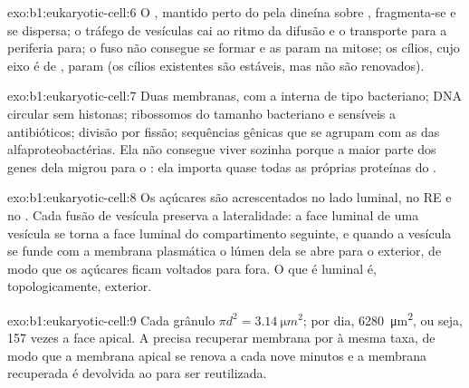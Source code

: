 \begin{solution}{exo:b1:eukaryotic-cell:6}
O , mantido perto do  pela dineína sobre ,
fragmenta-se e se dispersa; o tráfego de vesículas cai ao ritmo da
difusão e o transporte para a periferia para; o fuso não consegue se
formar e as  param na mitose; os cílios, cujo eixo é de
, param (os cílios existentes são estáveis, mas não são
renovados).
\end{solution}

\begin{solution}{exo:b1:eukaryotic-cell:7}
Duas membranas, com a interna de tipo bacteriano; DNA circular sem
histonas; ribossomos do tamanho bacteriano e sensíveis a antibióticos;
divisão por fissão; sequências gênicas que se agrupam com as das
alfaproteobactérias. Ela não consegue viver sozinha porque a maior parte
dos genes dela migrou para o : ela importa quase todas as próprias
proteínas do .
\end{solution}

\begin{solution}{exo:b1:eukaryotic-cell:8}
Os açúcares são acrescentados no lado luminal, no RE e no . Cada
fusão de vesícula preserva a lateralidade: a face luminal de uma
vesícula se torna a face luminal do compartimento seguinte, e quando a
vesícula se funde com a membrana plasmática o lúmen dela se abre para o
exterior, de modo que os açúcares ficam voltados para fora. O que é
luminal é, topologicamente, exterior.
\end{solution}

\begin{solution}{exo:b1:eukaryotic-cell:9}
Cada grânulo $\pi d^2 = \qty{3.14}{\micro m^2}$; por dia,
\qty{6280}{\micro m^2}, ou seja, \qty{157}{} vezes a face apical. A
 precisa recuperar membrana por  à mesma taxa, de modo
que a membrana apical se renova a cada nove minutos e a membrana
recuperada é devolvida ao  para ser reutilizada.
\end{solution}

